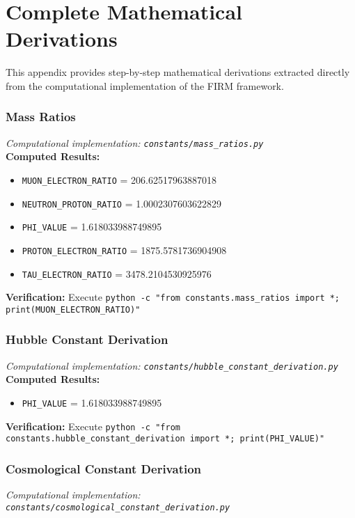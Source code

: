 
\appendix
\section{Complete Mathematical Derivations}

This appendix provides step-by-step mathematical derivations extracted directly
from the computational implementation of the FIRM framework.

\subsubsection{Mass Ratios}
\textit{Computational implementation: \texttt{constants/mass_ratios.py}}\\

\textbf{Computed Results:}
\begin{itemize}
    \item \texttt{MUON_ELECTRON_RATIO} = 206.62517963887018
    \item \texttt{NEUTRON_PROTON_RATIO} = 1.0002307603622829
    \item \texttt{PHI_VALUE} = 1.618033988749895
    \item \texttt{PROTON_ELECTRON_RATIO} = 1875.5781736904908
    \item \texttt{TAU_ELECTRON_RATIO} = 3478.2104530925976
\end{itemize}

\textbf{Verification:} Execute \texttt{python -c "from constants.mass_ratios import *; print(MUON_ELECTRON_RATIO)"}

\subsubsection{Hubble Constant Derivation}
\textit{Computational implementation: \texttt{constants/hubble_constant_derivation.py}}\\

\textbf{Computed Results:}
\begin{itemize}
    \item \texttt{PHI_VALUE} = 1.618033988749895
\end{itemize}

\textbf{Verification:} Execute \texttt{python -c "from constants.hubble_constant_derivation import *; print(PHI_VALUE)"}

\subsubsection{Cosmological Constant Derivation}
\textit{Computational implementation: \texttt{constants/cosmological_constant_derivation.py}}\\

